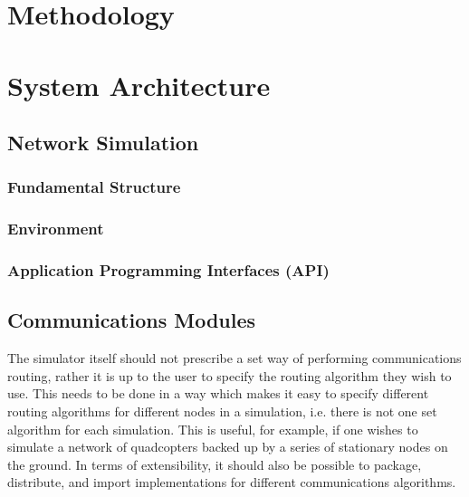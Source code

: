 \section{Methodology}

\section{System Architecture}

\subsection{Network Simulation}

\subsubsection{Fundamental Structure}

\subsubsection{Environment}

\subsubsection{Application Programming Interfaces (API)}

\subsection{Communications Modules}
The simulator itself should not prescribe a set way of performing communications routing, rather it is up to the user to specify the routing algorithm they wish to use. This needs to be done in a way which makes it easy to specify different routing algorithms for different nodes in a simulation, i.e. there is not one set algorithm for each simulation. This is useful, for example, if one wishes to simulate a network of quadcopters backed up by a series of stationary nodes on the ground. In terms of extensibility, it should also be possible to package, distribute, and import implementations for different communications algorithms.

